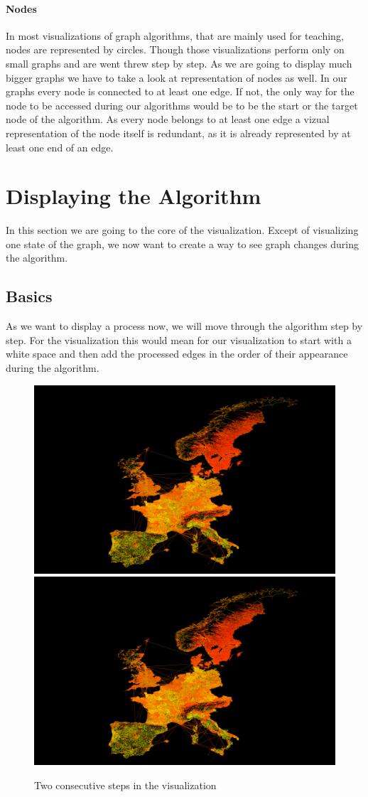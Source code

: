 \documentclass
[
	paper = a4,
    pagesize,
	12 pt,
	oneside,                       %
    open = right,
	DIV = calc,
	BCOR = 0 mm,                   %
	bibtotoc
]
{scrbook}
\begin{document}
\paragraph{Nodes}

In most visualizations of graph algorithms, that are mainly used for teaching, nodes are represented by circles.
Though those visualizations perform only on small graphs and are went threw step by step.
As we are going to display much bigger graphs we have to take a look at representation of nodes as well.
In our graphs every node is connected to at least one edge. If not, the only way for the node to be accessed during our algorithms would be to be the start or the target node of the algorithm.
As every node belongs to at least one edge a vizual representation of the node itself is redundant, as it is already represented by at least one end of an edge.



\section{Displaying the Algorithm}

In this section we are going to the core of the visualization. Except of visualizing one state of the graph, we now want to create a way to see graph changes during the algorithm.


\subsection{Basics}

As we want to display a process now, we will move through the algorithm step by step.
For the visualization this would mean for our visualization to start with a white space and then add the processed edges in the order of their appearance during the algorithm.

\begin{figure}[h!]
	\includegraphics[width=.5\textwidth]{Images/placeholder.png}
	\includegraphics[width=.5\textwidth]{Images/placeholder.png}
\caption[]{Two consecutive steps in the visualization}
\label{fig:projections}
\end{figure}
\end{document}

